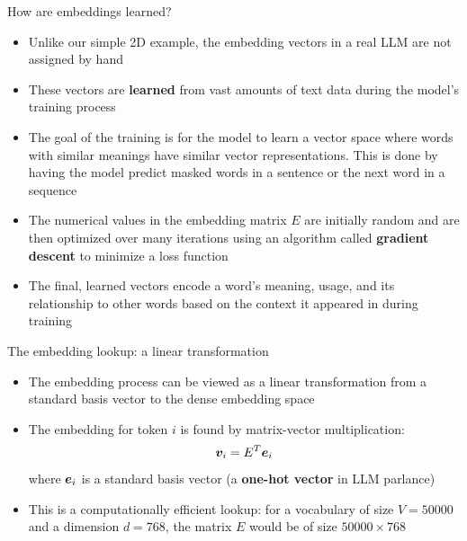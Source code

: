 \documentclass[aspectratio=169]{beamer}\usepackage[]{graphicx}\usepackage[]{xcolor}
\makeatletter
\newcommand{\defword}[1]{\textbf{\textcolor{beamer@blendedblue}{#1}}}
\makeatother
\begin{document}
\begin{frame}{How are embeddings learned?}
\begin{itemize}
\item Unlike our simple 2D example, the embedding vectors in a real LLM are not assigned by hand
\vfill
\item These vectors are \textbf{learned} from vast amounts of text data during the model's training process
\vfill
\item The goal of the training is for the model to learn a vector space where words with similar meanings have similar vector representations. This is done by having the model predict masked words in a sentence or the next word in a sequence
\vfill
\item The numerical values in the embedding matrix $E$ are initially random and are then optimized over many iterations using an algorithm called \textbf{gradient descent} to minimize a loss function
\vfill
\item The final, learned vectors encode a word's meaning, usage, and its relationship to other words based on the context it appeared in during training
\end{itemize}
\end{frame}

\begin{frame}{The embedding lookup: a linear transformation}
\begin{itemize}
\item The embedding process can be viewed as a linear transformation from a standard basis vector to the dense embedding space
\vfill
\item The embedding for token $i$ is found by matrix-vector multiplication:
  $$ \bm{v}_i = E^T \bm{e}_i $$
where $\bm{e}_i$ is a standard basis vector (a \defword{one-hot vector} in LLM parlance)
\vfill
\item This is a computationally efficient lookup: for a vocabulary of size $V = 50000$ and a dimension $d = 768$, the matrix $E$ would be of size $50000 \times 768$
\end{itemize}
\end{frame}
\end{document}
